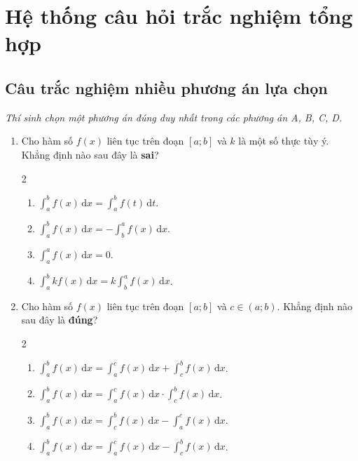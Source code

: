 \documentclass[12pt]{article}
\begin{document}
	\section{Hệ thống câu hỏi trắc nghiệm tổng hợp}\label{sec:tracnghiem}
	
	\subsection{Câu trắc nghiệm nhiều phương án lựa chọn}
	\textit{Thí sinh chọn một phương án đúng duy nhất trong các phương án A, B, C, D.}
	
	\begin{enumerate}[label=\textbf{Câu \arabic*.}]
		\item Cho hàm số $f(x)$ liên tục trên đoạn $[a; b]$ và $k$ là một số thực tùy ý. Khẳng định nào sau đây là \textbf{sai}?
		\begin{multicols}{2}
			\begin{enumerate}[label=\textbf{\Alph*.}]
				\item $\displaystyle \int_a^b f(x)\,\mathrm{d}x = \int_a^b f(t)\,\mathrm{d}t$.
				\item $\displaystyle \int_a^b f(x)\,\mathrm{d}x = -\int_b^a f(x)\,\mathrm{d}x$.
				\item $\displaystyle \int_a^a f(x)\,\mathrm{d}x = 0$.
				\item $\displaystyle \int_a^b k f(x)\,\mathrm{d}x = k \int_b^a f(x)\,\mathrm{d}x$.
			\end{enumerate}
		\end{multicols}
		
		\item Cho hàm số $f(x)$ liên tục trên đoạn $[a; b]$ và $c \in (a; b)$. Khẳng định nào sau đây là \textbf{đúng}?
		\begin{multicols}{2}
			\begin{enumerate}[label=\textbf{\Alph*.}]
				\item $\displaystyle \int_a^b f(x)\,\mathrm{d}x = \int_a^c f(x)\,\mathrm{d}x + \int_c^b f(x)\,\mathrm{d}x$.
				\item $\displaystyle \int_a^b f(x)\,\mathrm{d}x = \int_a^c f(x)\,\mathrm{d}x \cdot \int_c^b f(x)\,\mathrm{d}x$.
				\item $\displaystyle \int_a^b f(x)\,\mathrm{d}x = \int_c^b f(x)\,\mathrm{d}x - \int_a^c f(x)\,\mathrm{d}x$.
				\item $\displaystyle \int_a^b f(x)\,\mathrm{d}x = \int_a^c f(x)\,\mathrm{d}x - \int_c^b f(x)\,\mathrm{d}x$.
			\end{enumerate}
		\end{multicols}
		

\end{enumerate}
\end{document}
